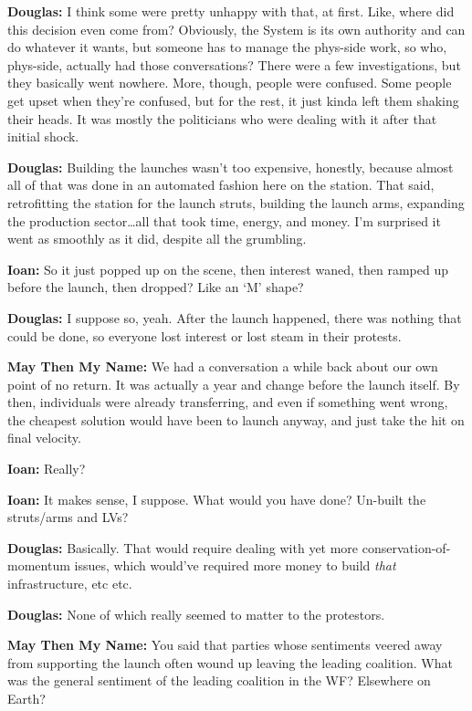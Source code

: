 \textbf{Douglas:} I think some were pretty unhappy with that, at first. Like, where did this decision even come from? Obviously, the System is its own authority and can do whatever it wants, but someone has to manage the phys-side work, so who, phys-side, actually had those conversations? There were a few investigations, but they basically went nowhere. More, though, people were confused. Some people get upset when they're confused, but for the rest, it just kinda left them shaking their heads. It was mostly the politicians who were dealing with it after that initial shock.

\textbf{Douglas:} Building the launches wasn't too expensive, honestly, because almost all of that was done in an automated fashion here on the station. That said, retrofitting the station for the launch struts, building the launch arms, expanding the production sector\ldots all that took time, energy, and money. I'm surprised it went as smoothly as it did, despite all the grumbling.

\textbf{Ioan:} So it just popped up on the scene, then interest waned, then ramped up before the launch, then dropped? Like an `M' shape?

\textbf{Douglas:} I suppose so, yeah. After the launch happened, there was nothing that could be done, so everyone lost interest or lost steam in their protests.

\textbf{May Then My Name:} We had a conversation a while back about our own point of no return. It was actually a year and change before the launch itself. By then, individuals were already transferring, and even if something went wrong, the cheapest solution would have been to launch anyway, and just take the hit on final velocity.

\textbf{Ioan:} Really?

\textbf{Ioan:} It makes sense, I suppose. What would you have done? Un-built the struts/arms and LVs?

\textbf{Douglas:} Basically. That would require dealing with yet more conservation-of-momentum issues, which would've required more money to build \emph{that} infrastructure, etc etc.

\textbf{Douglas:} None of which really seemed to matter to the protestors.

\textbf{May Then My Name:} You said that parties whose sentiments veered away from supporting the launch often wound up leaving the leading coalition. What was the general sentiment of the leading coalition in the WF? Elsewhere on Earth?

